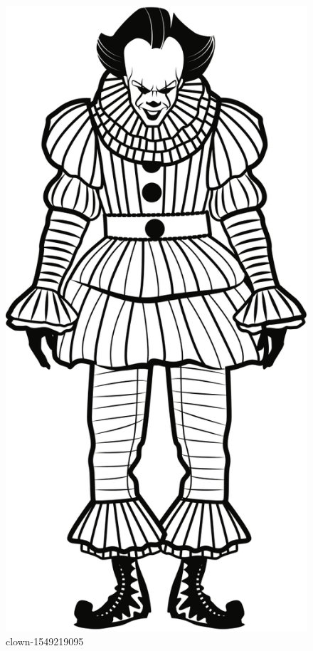 \begin{figure}
\centering
\includegraphics{images/clown-1549219095.svg}
\caption{clown-1549219095}
\end{figure}

